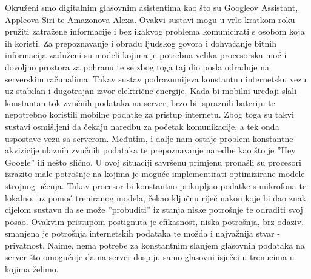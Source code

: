 Okruženi smo digitalnim glasovnim asistentima kao što su Googleov Assistant,
Appleova Siri te Amazonova Alexa. Ovakvi sustavi mogu u vrlo kratkom
roku pružiti zatražene informacije i bez ikakvog problema komunicirati s osobom
koja ih koristi. Za prepoznavanje i obradu ljudskog govora i dohvaćanje bitnih
informacija zaduženi su modeli kojima je potrebna velika procesorska moć i dovoljno
prostora za pohranu te se zbog toga taj dio posla odrađuje na serverskim računalima.
Takav sustav podrazumijeva konstantnu internetsku vezu uz stabilan i dugotrajan
izvor električne energije. Kada bi mobilni uređaji slali konstantan tok zvučnih podataka
na server, brzo bi ispraznili bateriju te nepotrebno koristili mobilne podatke za
pristup internetu. Zbog toga su takvi sustavi osmišljeni da čekaju naredbu za
početak komunikacije, a tek onda uspostave vezu sa serverom. Međutim, i dalje
nam ostaje problem konstantne akvizicije ulaznih zvučnih podataka te prepoznavanje
naredbe kao što je ”Hey Google” ili nešto slično. U ovoj situaciji savršenu primjenu
pronašli su procesori izrazito male potrošnje na kojima je moguće implementirati
optimizirane modele strojnog učenja. Takav procesor bi konstantno prikupljao podatke
s mikrofona te lokalno, uz pomoć treniranog modela, čekao ključnu riječ nakon
koje bi dao znak cijelom sustavu da se može ”probuditi” iz stanja niske
potrošnje te odraditi svoj posao. Ovakvim pristupom postignuta je efikasnost, niska
potrošnja, brz odaziv, smanjena je potrošnja internetskih podataka te možda i
najvažnija stvar - privatnost. Naime, nema potrebe za konstantnim slanjem glasovnih
podataka na server što omogućuje da na server dospiju samo glasovni isječci u
trenucima u kojima želimo.
